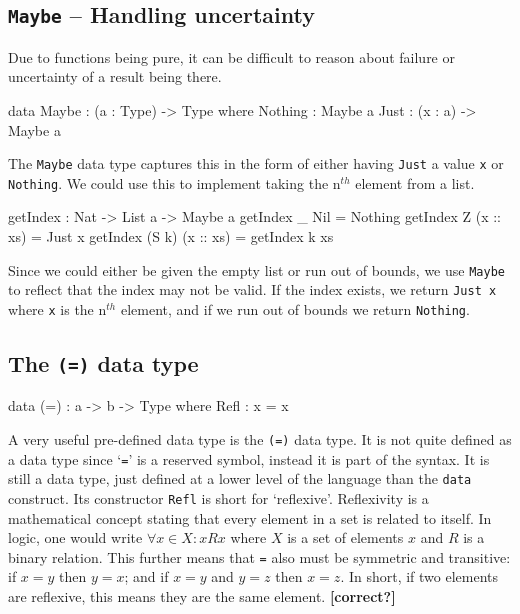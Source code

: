     \subsection{\texttt{Maybe} -- Handling uncertainty}
        Due to functions being pure, it can be difficult to reason about failure or uncertainty of a result being there.
        \begin{code}[caption={The \texttt{Maybe} data type}]
        data Maybe : (a : Type) -> Type where
            Nothing : Maybe a
            Just : (x : a) -> Maybe a
        \end{code}
        The \texttt{Maybe} data type captures this in the form of either having \texttt{Just} a value \texttt{x} or \texttt{Nothing}. We could use this to implement taking the n$^{th}$ element from a list.
        \begin{code}[caption={List indexing using \texttt{Maybe}}]
        getIndex : Nat -> List a -> Maybe a
        getIndex _ Nil = Nothing
        getIndex Z (x :: xs) = Just x
        getIndex (S k) (x :: xs) = getIndex k xs
        \end{code}
        Since we could either be given the empty list or run out of bounds, we use \texttt{Maybe} to reflect that the index may not be valid. If the index exists, we return \texttt{Just x} where \texttt{x} is the n$^{th}$ element, and if we run out of bounds we return \texttt{Nothing}.

    \subsection{The \texttt{(=)} data type}
        \begin{code}[label={des:refl-concept}, caption={The concept of an equality data type}]
            data (=) : a -> b -> Type where
                Refl : x = x
        \end{code}
        
        A very useful pre-defined data type is the \texttt{(=)} data type. It is not quite defined as a data type since `\texttt{=}' is a reserved symbol, instead it is part of the \Idris syntax. It is still a data type, just defined at a lower level of the language than the \texttt{data} construct. Its constructor \texttt{Refl} is short for `reflexive'. Reflexivity is a mathematical concept stating that every element in a set is related to itself. In logic, one would write $\forall x \in X : x R x$ where $X$ is a set of elements $x$ and $R$ is a binary relation. This further means that \texttt{=} also must be symmetric and transitive: if $x = y$ then $y = x$; and if $x = y$ and $y = z$ then $x = z$. In short, if two elements are reflexive, this means they are the same element. \textbf{[correct?]}
        
